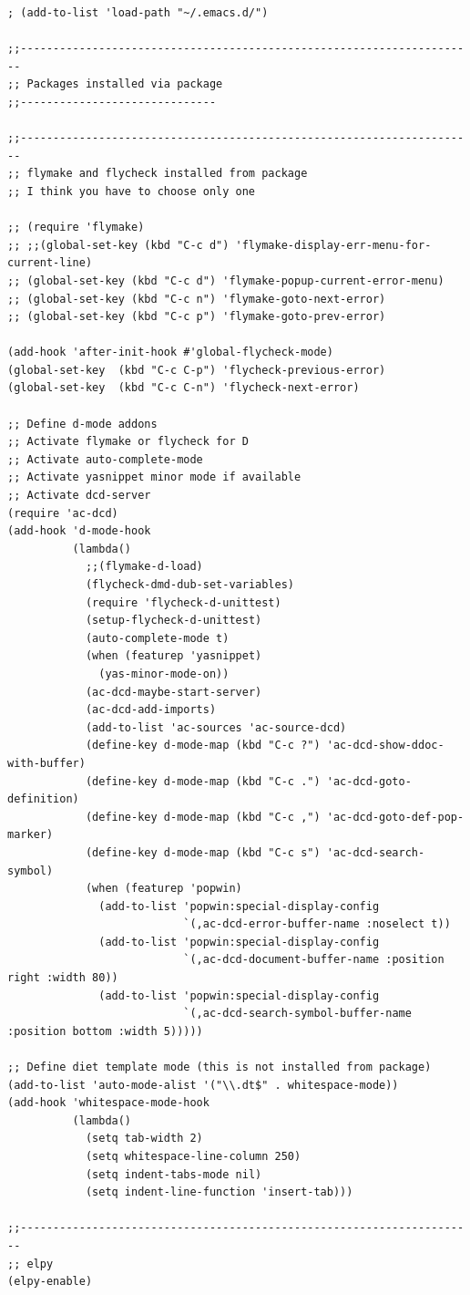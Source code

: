 \documentclass[12pt,spanish,]{article}
\begin{document}
\begin{verbatim}
; (add-to-list 'load-path "~/.emacs.d/")

;;----------------------------------------------------------------------
;; Packages installed via package
;;------------------------------

;;----------------------------------------------------------------------
;; flymake and flycheck installed from package
;; I think you have to choose only one

;; (require 'flymake)
;; ;;(global-set-key (kbd "C-c d") 'flymake-display-err-menu-for-current-line)
;; (global-set-key (kbd "C-c d") 'flymake-popup-current-error-menu)
;; (global-set-key (kbd "C-c n") 'flymake-goto-next-error)
;; (global-set-key (kbd "C-c p") 'flymake-goto-prev-error)

(add-hook 'after-init-hook #'global-flycheck-mode)
(global-set-key  (kbd "C-c C-p") 'flycheck-previous-error)
(global-set-key  (kbd "C-c C-n") 'flycheck-next-error)

;; Define d-mode addons
;; Activate flymake or flycheck for D
;; Activate auto-complete-mode
;; Activate yasnippet minor mode if available
;; Activate dcd-server
(require 'ac-dcd)
(add-hook 'd-mode-hook
          (lambda()
            ;;(flymake-d-load)
            (flycheck-dmd-dub-set-variables)
            (require 'flycheck-d-unittest)
            (setup-flycheck-d-unittest)
            (auto-complete-mode t)
            (when (featurep 'yasnippet)
              (yas-minor-mode-on))
            (ac-dcd-maybe-start-server)
            (ac-dcd-add-imports)
            (add-to-list 'ac-sources 'ac-source-dcd)
            (define-key d-mode-map (kbd "C-c ?") 'ac-dcd-show-ddoc-with-buffer)
            (define-key d-mode-map (kbd "C-c .") 'ac-dcd-goto-definition)
            (define-key d-mode-map (kbd "C-c ,") 'ac-dcd-goto-def-pop-marker)
            (define-key d-mode-map (kbd "C-c s") 'ac-dcd-search-symbol)
            (when (featurep 'popwin)
              (add-to-list 'popwin:special-display-config
                           `(,ac-dcd-error-buffer-name :noselect t))
              (add-to-list 'popwin:special-display-config
                           `(,ac-dcd-document-buffer-name :position right :width 80))
              (add-to-list 'popwin:special-display-config
                           `(,ac-dcd-search-symbol-buffer-name :position bottom :width 5)))))

;; Define diet template mode (this is not installed from package)
(add-to-list 'auto-mode-alist '("\\.dt$" . whitespace-mode))
(add-hook 'whitespace-mode-hook
          (lambda()
            (setq tab-width 2)
            (setq whitespace-line-column 250)
            (setq indent-tabs-mode nil)
            (setq indent-line-function 'insert-tab)))

;;----------------------------------------------------------------------
;; elpy
(elpy-enable)
\end{verbatim}
\end{document}
